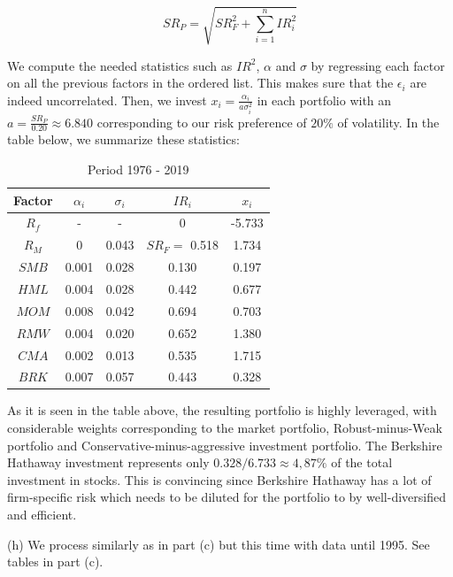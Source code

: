 \documentclass[10pt]{article}
\newenvironment{exercise}[2][Exercise]{\begin{trivlist}
  \item[\hskip \labelsep {\bfseries #1}\hskip \labelsep {\bfseries #2.}]}{\end{trivlist}}
\begin{document}
\begin{exercise}{3}
\begin{equation}
  SR_P = \sqrt{SR_F^2 + \sum_{i = 1}^n IR^2_i}
\end{equation}

We compute the needed statistics such as $IR^2$, $\alpha$ and $\sigma$ by
regressing each factor on all the previous factors in the ordered list. This
makes sure that the $\epsilon_i$ are indeed uncorrelated. Then, we invest $x_i =
\frac{\alpha_i}{a \sigma_i^2}$ in each portfolio with an $a = \frac{SR_P}{0.20}
\approx 6.840$ corresponding to our risk preference of $20\%$ of volatility. In the table
below, we summarize these statistics:

\begin{table}[h!]
  \centering
  \begin{tabular}{||c c c c c||} 
    \hline
    Factor & $\alpha_i$ & $\sigma_i$ & $IR_i$ &  $x_i$ \\
    \hline\hline
    $R_f$ & - & - & 0 &  -5.733 \\
    $R_M$ & 0 & 0.043 & $SR_F = $ 0.518 & 1.734 \\
    $SMB$ & 0.001 & 0.028 & 0.130 &  0.197 \\
    $HML$ & 0.004 & 0.028 & 0.442 & 0.677 \\
    $MOM$ & 0.008 & 0.042 & 0.694 & 0.703 \\
    $RMW$ & 0.004 & 0.020 & 0.652 & 1.380 \\
    $CMA$ & 0.002 & 0.013 & 0.535 & 1.715 \\
    $BRK$ & 0.007 & 0.057 & 0.443 & 0.328 \\
    \hline\hline
    \end{tabular}
    \caption{Period 1976 - 2019}
\end{table}

As it is seen in the table above, the resulting portfolio is highly leveraged,
with considerable weights corresponding to the market portfolio,
Robust-minus-Weak portfolio and
Conservative-minus-aggressive investment portfolio. The Berkshire Hathaway
investment represents only $0.328/6.733 \approx 4,87 \%$ of the total investment
in stocks. This is convincing since Berkshire Hathaway has a lot of firm-specific risk
which needs to be diluted for the portfolio to by well-diversified and efficient.

	
	(h) We process similarly as in part (c) but this time with data until 1995.
  See tables in part (c). 


\end{exercise}
\end{document}
